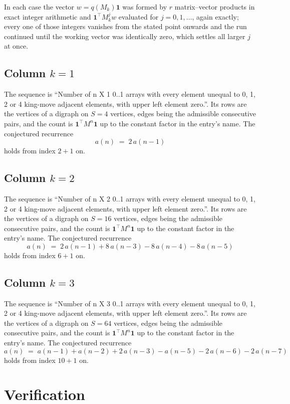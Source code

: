 \documentclass[11pt,a4paper]{article}
\theoremstyle{plain}
\theoremstyle{definition}
\begin{document}
In each case the vector $w=q(M_k)\mathbf{1}$ was formed by $r$ matrix--vector products in
exact integer arithmetic and $\mathbf{1}^{\!\top}M_k^{j}w$ evaluated for $j=0,1,\dots$,
again exactly; every one of those integers vanishes from the stated point onwards and the run
continued until the working vector was identically zero, which settles all larger $j$ at once.

\subsection*{Column $k$$=1$}
The sequence is ``Number of n X 1 0..1 arrays with every element unequal to 0, 1, 2 or 4 king-move adjacent elements, with upper left element zero.''. Its rows are the vertices of a digraph on
$S=4$ vertices, edges being the admissible consecutive pairs, and the count is
$\mathbf{1}^{\!\top}M^{n}\mathbf{1}$ up to the constant factor in the entry's name.
The conjectured recurrence
\[
a(n)\;=\;2\,a(n-1)
\]
holds from index $2+1$ on.

\subsection*{Column $k$$=2$}
The sequence is ``Number of n X 2 0..1 arrays with every element unequal to 0, 1, 2 or 4 king-move adjacent elements, with upper left element zero.''. Its rows are the vertices of a digraph on
$S=16$ vertices, edges being the admissible consecutive pairs, and the count is
$\mathbf{1}^{\!\top}M^{n}\mathbf{1}$ up to the constant factor in the entry's name.
The conjectured recurrence
\[
a(n)\;=\;2\,a(n-1) + 8\,a(n-3) - 8\,a(n-4) - 8\,a(n-5)
\]
holds from index $6+1$ on.

\subsection*{Column $k$$=3$}
The sequence is ``Number of n X 3 0..1 arrays with every element unequal to 0, 1, 2 or 4 king-move adjacent elements, with upper left element zero.''. Its rows are the vertices of a digraph on
$S=64$ vertices, edges being the admissible consecutive pairs, and the count is
$\mathbf{1}^{\!\top}M^{n}\mathbf{1}$ up to the constant factor in the entry's name.
The conjectured recurrence
\[
a(n)\;=\;a(n-1) + a(n-2) + 2\,a(n-3) - a(n-5) - 2\,a(n-6) - 2\,a(n-7)
\]
holds from index $10+1$ on.

\section{Verification}
\end{document}

